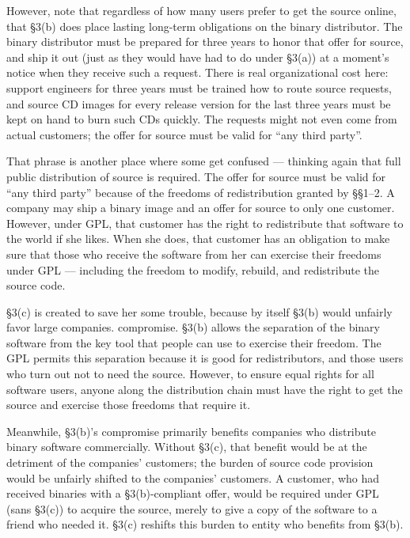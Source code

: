 \documentclass[12pt]{report}
\begin{document}
However, note that regardless of how many users prefer to get the source
online, that \S 3(b) does place lasting long-term obligations on the
binary distributor.  The binary distributor must be prepared for three
years to honor that offer for source, and ship it out (just as they would
have had to do under \S 3(a)) at a moment's notice when they receive such
a request.  There is real organizational cost here: support engineers for
three years must be trained how to route source requests, and source CD
images for every release version for the last three years must be kept on
hand to burn such CDs quickly.  The requests might not even come from
actual customers; the offer for source must be valid for ``any third
party''.

That phrase is another place where some get confused --- thinking again
that full public distribution of source is required.  The offer for source
must be valid for ``any third party'' because of the freedoms of
redistribution granted by \S\S 1--2.  A company may ship a binary image
and an offer for source to only one customer.  However, under GPL, that
customer has the right to redistribute that software to the world if she
likes.  When she does, that customer has an obligation to make sure that
those who receive the software from her can exercise their freedoms under
GPL --- including the freedom to modify, rebuild, and redistribute the
source code.

\S 3(c) is created to save her some trouble, because by itself \S 3(b)
would unfairly favor large companies.  compromise.  \S 3(b) allows the
separation of the binary software from the key tool that people can use
to exercise their freedom.  The GPL permits this separation because it is
good for redistributors, and those users who turn out not to need the
source.  However, to ensure equal rights for all software users, anyone
along the distribution chain must have the right to get the source and
exercise those freedoms that require it.

Meanwhile, \S 3(b)'s compromise primarily benefits companies who
distribute binary software commercially.  Without \S 3(c), that benefit
would be at the detriment of the companies' customers; the burden of
source code provision would be unfairly shifted to the companies'
customers.  A customer, who had received binaries with a \S 3(b)-compliant
offer, would be required under GPL (sans \S 3(c)) to acquire the source,
merely to give a copy of the software to a friend who needed it.  \S 3(c)
reshifts this burden to entity who benefits from \S 3(b).
\end{document}
